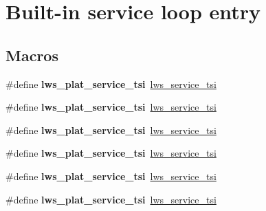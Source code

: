 \hypertarget{group__service}{}\section{Built-\/in service loop entry}
\label{group__service}
\subsection*{Macros}
\begin{DoxyCompactItemize}
\item 
\mbox{\label{group__service_ga6ea5876f3c73bf201b250d041805b706}} 
\#define {\bfseries lws\+\_\+plat\+\_\+service\+\_\+tsi}~\hyperlink{group__service_ga9b3cc4473fd8848e5bbee7f310712939}{lws\+\_\+service\+\_\+tsi}
\item 
\mbox{\label{group__service_ga6ea5876f3c73bf201b250d041805b706}} 
\#define {\bfseries lws\+\_\+plat\+\_\+service\+\_\+tsi}~\hyperlink{group__service_ga9b3cc4473fd8848e5bbee7f310712939}{lws\+\_\+service\+\_\+tsi}
\item 
\mbox{\label{group__service_ga6ea5876f3c73bf201b250d041805b706}} 
\#define {\bfseries lws\+\_\+plat\+\_\+service\+\_\+tsi}~\hyperlink{group__service_ga9b3cc4473fd8848e5bbee7f310712939}{lws\+\_\+service\+\_\+tsi}
\item 
\mbox{\label{group__service_ga6ea5876f3c73bf201b250d041805b706}} 
\#define {\bfseries lws\+\_\+plat\+\_\+service\+\_\+tsi}~\hyperlink{group__service_ga9b3cc4473fd8848e5bbee7f310712939}{lws\+\_\+service\+\_\+tsi}
\item 
\mbox{\label{group__service_ga6ea5876f3c73bf201b250d041805b706}} 
\#define {\bfseries lws\+\_\+plat\+\_\+service\+\_\+tsi}~\hyperlink{group__service_ga9b3cc4473fd8848e5bbee7f310712939}{lws\+\_\+service\+\_\+tsi}
\item 
\mbox{\label{group__service_ga6ea5876f3c73bf201b250d041805b706}} 
\#define {\bfseries lws\+\_\+plat\+\_\+service\+\_\+tsi}~\hyperlink{group__service_ga9b3cc4473fd8848e5bbee7f310712939}{lws\+\_\+service\+\_\+tsi}
\end{DoxyCompactItemize}
